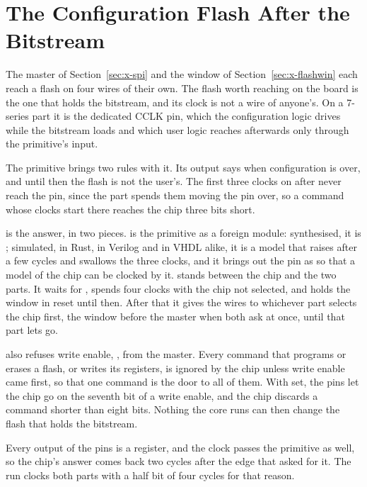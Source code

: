 \section{The Configuration Flash After the Bitstream}
\label{sec:x-cfgflash}

The master of Section~\ref{sec:x-spi} and the window of
Section~\ref{sec:x-flashwin} each reach a flash on four wires of their
own. The flash worth reaching on the board is the one that holds the
bitstream, and its clock is not a wire of anyone's. On a 7-series part
it is the dedicated CCLK pin, which the configuration logic drives
while the bitstream loads and which user logic reaches afterwards only
through the  primitive's  input.

The primitive brings two rules with it. Its  output says
when configuration is over, and until then the flash is not the user's.
The first three clocks on  after  never reach
the pin, since the part spends them moving the pin over, so a command
whose clocks start there reaches the chip three bits short.

 is the answer, in two pieces.  is the
primitive as a foreign module: synthesised, it is ;
simulated, in Rust, in Verilog and in VHDL alike, it is a model that
raises  after a few cycles and swallows the three clocks, and
it brings out the pin as  so that a model of the chip can
be clocked by it.  stands between the chip and the two
parts. It waits for , spends four clocks with the chip not
selected, and holds the window in reset until then. After that it
gives the wires to whichever part selects the chip first, the window
before the master when both ask at once, until that part lets go.

 also refuses write enable, , from the
master. Every command that programs or erases a flash, or writes its
registers, is ignored by the chip unless write enable came first, so
that one command is the door to all of them. With  set,
the pins let the chip go on the seventh bit of a write enable, and the
chip discards a command shorter than eight bits. Nothing the core runs
can then change the flash that holds the bitstream.

Every output of the pins is a register, and the clock passes the
primitive as well, so the chip's answer comes back two cycles after
the edge that asked for it. The run clocks both parts with a half bit
of four cycles for that reason.

